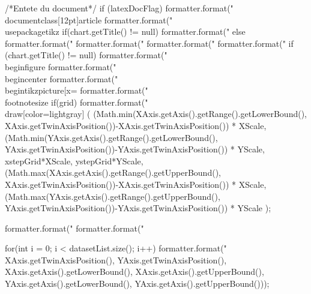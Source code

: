 \begin{code}
\begin{hide}
{      /*Entete du document*/
      if (latexDocFlag) {
         formatter.format("\\documentclass[12pt]{article}%
         formatter.format("\\usepackage{tikz}%
      }
      if(chart.getTitle() != null)
         formatter.format("%
      else
         formatter.format("%
      formatter.format("%
      formatter.format("%
      formatter.format("%
      if (chart.getTitle() != null)
         formatter.format("\\begin{figure}%
      formatter.format("\\begin{center}%
      formatter.format("\\begin{tikzpicture}[x=%
      formatter.format("\\footnotesize%
      if(grid)
         formatter.format("\\draw[color=lightgray] (%
            (Math.min(XAxis.getAxis().getRange().getLowerBound(), XAxis.getTwinAxisPosition())-XAxis.getTwinAxisPosition()) * XScale,
            (Math.min(YAxis.getAxis().getRange().getLowerBound(), YAxis.getTwinAxisPosition())-YAxis.getTwinAxisPosition()) * YScale,
            xstepGrid*XScale, ystepGrid*YScale,
            (Math.max(XAxis.getAxis().getRange().getUpperBound(), XAxis.getTwinAxisPosition())-XAxis.getTwinAxisPosition()) * XScale,
            (Math.max(YAxis.getAxis().getRange().getUpperBound(), YAxis.getTwinAxisPosition())-YAxis.getTwinAxisPosition()) * YScale );

      formatter.format("%
      formatter.format("%

      for(int i = 0; i < datasetList.size(); i++)
         formatter.format("%
                                                            XAxis.getTwinAxisPosition(), YAxis.getTwinAxisPosition(),
                                                            XAxis.getAxis().getLowerBound(), XAxis.getAxis().getUpperBound(),
                                                            YAxis.getAxis().getLowerBound(), YAxis.getAxis().getUpperBound()));

}
\end{hide}
\end{code}
